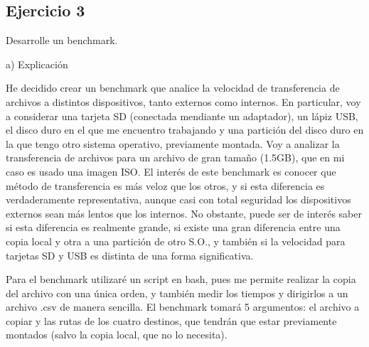 \documentclass[a4paper, 11pt]{article} %
\begin{document}
\subsection{Ejercicio 3}
Desarrolle un benchmark. 

a) Explicación

He decidido crear un benchmark que analice la velocidad de transferencia de archivos a distintos dispositivos, tanto externos como internos. En particular, voy a considerar una tarjeta SD (conectada mendiante un adaptador), un lápiz USB, el disco duro en el que me encuentro trabajando y una partición del disco duro en la que tengo otro sistema operativo, previamente montada. Voy a analizar la transferencia de archivos para un archivo de gran tamaño (1.5GB), que en mi caso es usado una imagen ISO. El interés de este benchmark es conocer que método de transferencia es más veloz que los otros, y si esta diferencia es verdaderamente representativa, aunque casi con total seguridad los dispositivos externos sean más lentos que los internos. No obstante, puede ser de interés saber si esta diferencia es realmente grande, si existe una gran diferencia entre una copia local y otra a una partición de otro S.O., y también si la velocidad para tarjetas SD y USB es distinta de una forma significativa. 

Para el benchmark utilizaré un script en bash, pues me permite realizar la copia del archivo con una única orden, y también medir los tiempos y dirigirlos a un archivo .csv de manera sencilla. El benchmark tomará 5 argumentos: el archivo a copiar y las rutas de los cuatro destinos, que tendrán que estar previamente montados (salvo la copia local, que no lo necesita). 
\end{document}
